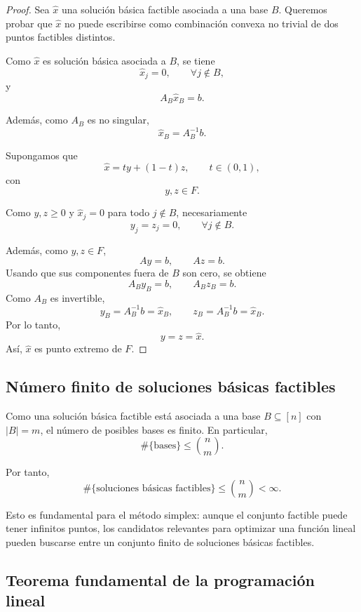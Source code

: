\begin{proof}
Sea \(\widehat{x}\) una solución básica factible asociada a una base \(B\). Queremos probar que \(\widehat{x}\) no puede escribirse como combinación convexa no trivial de dos puntos factibles distintos.

Como \(\widehat{x}\) es solución básica asociada a \(B\), se tiene
\[
    \widehat{x}_j=0,
    \qquad
    \forall j\notin B,
\]
y
\[
    A_B\widehat{x}_B=b.
\]

Además, como \(A_B\) es no singular,
\[
    \widehat{x}_B=A_B^{-1}b.
\]

Supongamos que
\[
    \widehat{x}
    =
    t y+(1-t)z,
    \qquad
    t\in(0,1),
\]
con
\[
    y,z\in F.
\]

Como \(y,z\geq 0\) y \(\widehat{x}_j=0\) para todo \(j\notin B\), necesariamente
\[
    y_j=z_j=0,
    \qquad
    \forall j\notin B.
\]

Además, como \(y,z\in F\),
\[
    Ay=b,
    \qquad
    Az=b.
\]
Usando que sus componentes fuera de \(B\) son cero, se obtiene
\[
    A_By_B=b,
    \qquad
    A_Bz_B=b.
\]
Como \(A_B\) es invertible,
\[
    y_B=A_B^{-1}b=\widehat{x}_B,
    \qquad
    z_B=A_B^{-1}b=\widehat{x}_B.
\]
Por lo tanto,
\[
    y=z=\widehat{x}.
\]
Así, \(\widehat{x}\) es punto extremo de \(F\).
\end{proof}

\subsection{Número finito de soluciones básicas factibles}

Como una solución básica factible está asociada a una base \(B\subseteq[n]\) con \(|B|=m\), el número de posibles bases es finito. En particular,
\[
    \#\{\text{bases}\}
    \leq
    \binom{n}{m}.
\]

Por tanto,
\[
    \#\{\text{soluciones básicas factibles}\}
    \leq
    \binom{n}{m}
    <\infty.
\]

\begin{remark}
Esto es fundamental para el método simplex: aunque el conjunto factible puede tener infinitos puntos, los candidatos relevantes para optimizar una función lineal pueden buscarse entre un conjunto finito de soluciones básicas factibles.
\end{remark}

\subsection{Teorema fundamental de la programación lineal}

